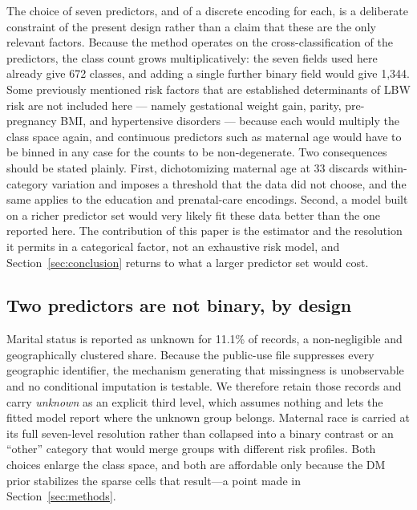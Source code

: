 \documentclass[AMA]{USG}
\begin{document}

The choice of seven predictors, and of a discrete encoding for each, is a deliberate constraint of the present design rather than a claim that these are the only relevant factors. Because the method operates on the cross-classification of the predictors, the class count grows multiplicatively: the seven fields used here already give 672 classes, and adding a single further binary field would give 1{,}344. Some previously mentioned risk factors that are established determinants of LBW risk are not included here --- namely gestational weight gain, parity, pre-pregnancy BMI, and hypertensive disorders --- because each would multiply the class space again, and continuous predictors such as maternal age would have to be binned in any case for the counts to be non-degenerate. Two consequences should be stated plainly. First, dichotomizing maternal age at 33 discards within-category variation and imposes a threshold that the data did not choose, and the same applies to the education and prenatal-care encodings. Second, a model built on a richer predictor set would very likely fit these data better than the one reported here. The contribution of this paper is the estimator and the resolution it permits in a categorical factor, not an exhaustive risk model, and Section~\ref{sec:conclusion} returns to what a larger predictor set would cost.


\subsection{Two predictors are not binary, by design}
Marital status is reported as unknown for 11.1\% of records, a non-negligible and geographically clustered share. Because the public-use file suppresses every geographic identifier, the mechanism generating that missingness is unobservable and no conditional imputation is testable. We therefore retain those records and carry \emph{unknown} as an explicit third level, which assumes nothing and lets the fitted model report where the unknown group belongs. Maternal race is carried at its full seven-level resolution rather than collapsed into a binary contrast or an ``other'' category that would merge groups with different risk profiles. Both choices enlarge the class space, and both are affordable only because the DM prior stabilizes the sparse cells that result---a point made in Section~\ref{sec:methods}.
\end{document}
